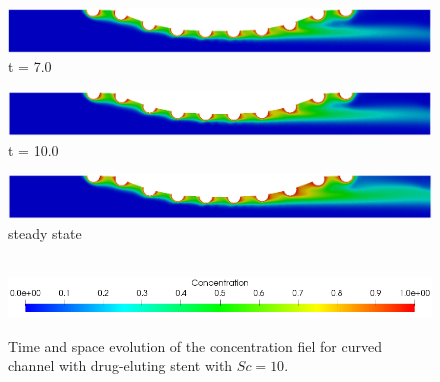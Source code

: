 \begin{figure}[H]
\begin{minipage}{.50\linewidth}
      \centering
      \includegraphics[scale=0.18]{./02_chaps/cap_solution/figure/conc10_CurvedStrut6.png}\\
      t = 7.0
     \end{minipage}
     \begin{minipage}{.50\linewidth}
     \medskip
      \centering
      \includegraphics[scale=0.18]{./02_chaps/cap_solution/figure/conc10_CurvedStrut7.png}\\
      t = 10.0
     \end{minipage}%
     \begin{minipage}{.50\linewidth}
     \medskip
      \centering
      \includegraphics[scale=0.18]{./02_chaps/cap_solution/figure/conc10_CurvedStrut8.png}\\
      steady state
     \end{minipage}\\[10pt]
      \centering
      \includegraphics[scale=0.5]{./02_chaps/cap_solution/figure/conc1_CurvedStrutScale.png}\\
     \medskip
    \caption{
Time and space evolution of the concentration fiel for curved channel with drug-eluting stent with $Sc=10$.}
     \label{conc field curved stent sc 10}
\end{figure}




